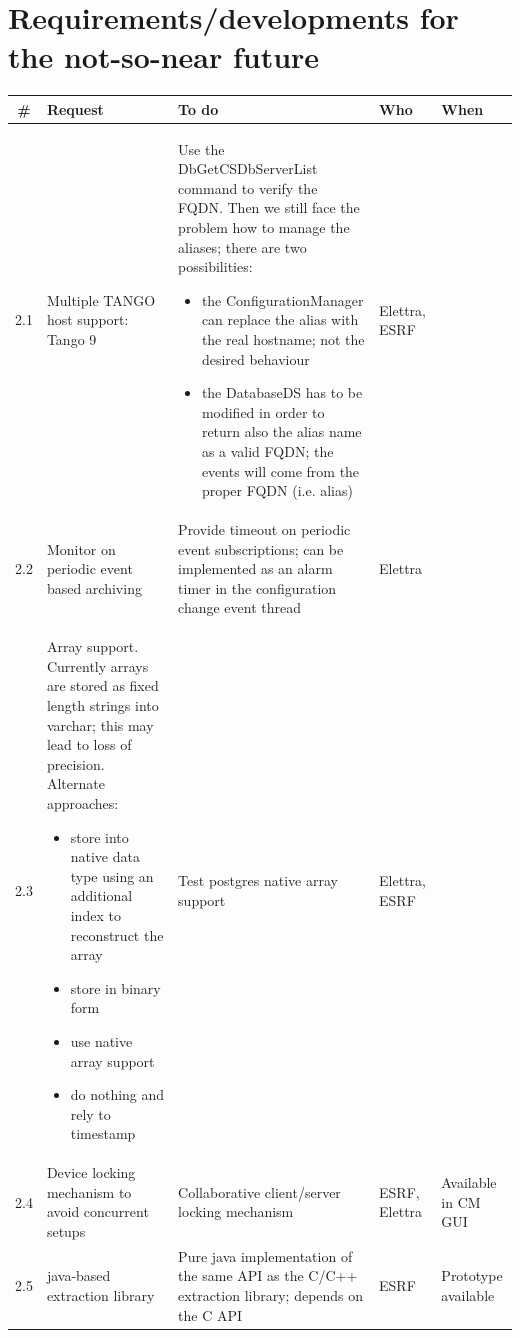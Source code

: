 \documentclass[11pt,a4paper]{article}
\begin{document}
\newpage

\section{Requirements/developments for the not-so-near future}

\begin{longtable}{|c|p{6.0cm}|p{6.0cm}|p{1.0cm}|p{1.4cm}|}
	\hline
	\bf{\#} & \bf{Request} & \bf{To do} & \bf{Who} & \bf{When} \\
	\hline
	\endhead
	2.1 &
	Multiple TANGO host support: Tango 9 & 
	Use the DbGetCSDbServerList command to verify the FQDN.
	Then we still face the problem how to manage the aliases; there are
	two possibilities:
	\begin{itemize}
		\item the ConfigurationManager can replace the alias with the
					real hostname; not the desired behaviour
		\item the DatabaseDS has to be modified in order to return also
					the alias name as a valid FQDN; the events will come from
					the proper FQDN (i.e. alias)
	\end{itemize} &
	Elettra, ESRF &
	\\
	\hline
	2.2 &
	Monitor on periodic event based archiving &
	Provide timeout on periodic event subscriptions; can be
	implemented as an alarm timer in the configuration change
	event thread &
	Elettra &
	\\
	\hline
	2.3 &
	Array support. Currently arrays are stored as fixed length
	strings into varchar; this may lead to loss of precision.
	Alternate approaches:
	\begin{itemize}
		\item store into native data type using an additional index to
		    	reconstruct the array
		\item store in binary form
		\item use native array support
		\item do nothing and rely to timestamp
	\end{itemize} &
	Test postgres native array support &
	Elettra, ESRF &
	\\
	\hline
	2.4 &
	Device locking mechanism to avoid concurrent setups &
	Collaborative client/server locking mechanism &
	ESRF, Elettra &
	Available in CM GUI \\
	\hline
	2.5 &
	java-based extraction library &
	Pure java implementation of the same API as the C/C++ extraction
	library; depends on the C API &
	ESRF &
	Prototype available \\

\end{longtable}
\end{document}
